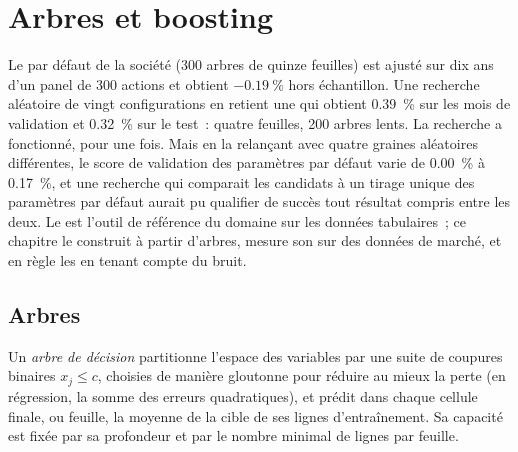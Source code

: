 \chapter{Arbres et boosting}\label{ch:ml:trees-and-boosting}

Le  par défaut de la société (300 arbres de quinze feuilles) est ajusté sur dix ans d'un panel de 300 actions et obtient $-0.19~\%$ hors échantillon.
Une recherche aléatoire de vingt configurations en retient une qui obtient 0.39~\% sur les
mois de validation et 0.32~\% sur le test~: quatre feuilles, 200 arbres lents. La recherche a fonctionné, pour une fois. Mais en la relançant avec quatre
graines aléatoires différentes, le score de validation des paramètres par défaut varie de 0.00~\% à 0.17~\%, et une recherche qui comparait les
candidats à un tirage unique des paramètres par défaut aurait pu qualifier de succès tout résultat compris entre les deux. Le  est
l'outil de référence du domaine sur les données tabulaires~; ce chapitre le construit à partir d'arbres, mesure son  sur des données de marché,
et en règle les  en tenant compte du bruit.

\section{Arbres}

\begin{definition}\label{def:ml:trees-and-boosting:tree}
Un \emph{arbre de décision} partitionne l'espace des variables par une suite de coupures binaires $x_j\le c$,
choisies de manière gloutonne pour réduire au mieux la perte (en régression, la somme des erreurs quadratiques), et prédit dans chaque cellule finale,
ou feuille, la moyenne de la cible de ses lignes d'entraînement. Sa capacité est fixée par sa profondeur et par le nombre minimal de lignes par
feuille.
\end{definition}

